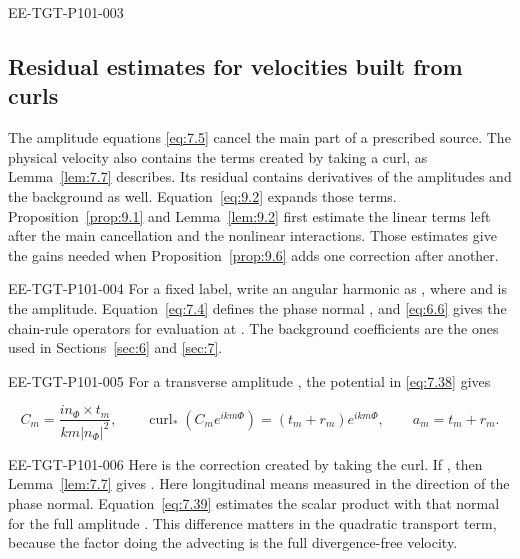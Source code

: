 \begin{EESegment}{EE-TGT-P101-003}
\subsection{Residual estimates for velocities built from curls}\label{sec:9.1}
The amplitude equations \eqref{eq:7.5} cancel the main part of a prescribed source. The physical
velocity also contains the terms created by taking a curl, as Lemma~\ref{lem:7.7} describes. Its
residual contains derivatives of the amplitudes and the background as well. Equation~\eqref{eq:9.2}
expands those terms. Proposition~\ref{prop:9.1} and Lemma~\ref{lem:9.2} first estimate the linear
terms left after the main cancellation and the nonlinear interactions. Those estimates give the
gains needed when Proposition~\ref{prop:9.6} adds one correction after another.
\end{EESegment}

\begin{EESegment}{EE-TGT-P101-004}
For a fixed label, write an angular harmonic as
, where
 and
 is the amplitude. Equation~\eqref{eq:7.4} defines the phase normal
, and \eqref{eq:6.6} gives the chain-rule operators for evaluation at
. The background coefficients
 are the ones used in Sections~\ref{sec:6} and \ref{sec:7}.
\end{EESegment}

\begin{EESegment}{EE-TGT-P101-005}
For a transverse amplitude , the potential in \eqref{eq:7.38} gives
\end{EESegment}
\[
C_m=\frac{i n_\Phi\times t_m}{km|n_\Phi|^2},
\qquad
\operatorname{curl}_*(C_me^{ikm\Phi})=(t_m+r_m)e^{ikm\Phi},
\qquad
a_m=t_m+r_m.
\]
\begin{EESegment}{EE-TGT-P101-006}
Here  is the correction created by taking the curl. If
, then Lemma~\ref{lem:7.7} gives
. Here longitudinal means measured in
the direction of the phase normal. Equation~\eqref{eq:7.39} estimates the scalar product with that normal for the
full amplitude . This difference matters
in the quadratic transport term, because the factor doing the advecting is the full divergence-free
velocity.
\end{EESegment}

